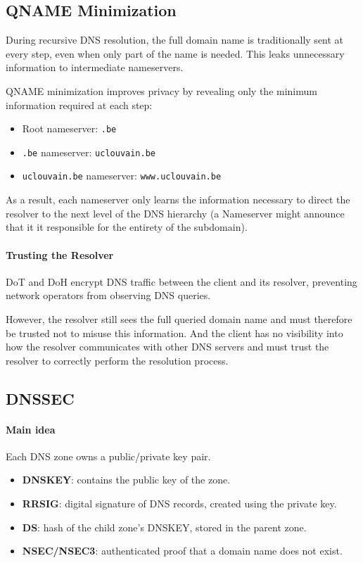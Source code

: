 \subsection{QNAME Minimization}

During recursive DNS resolution, the full domain name is traditionally sent at every step, even when only part of the name is needed. This leaks unnecessary information to intermediate nameservers.

QNAME minimization improves privacy by revealing only the minimum information required at each step:

\begin{itemize}
    \item Root nameserver: \texttt{.be}
    \item \texttt{.be} nameserver: \texttt{uclouvain.be}
    \item \texttt{uclouvain.be} nameserver: \texttt{www.uclouvain.be}
\end{itemize}

As a result, each nameserver only learns the information necessary to direct the resolver to the next level of the DNS hierarchy (a Nameserver might announce that it it responsible for the entirety of the subdomain).

\paragraph{Trusting the Resolver}

DoT and DoH encrypt DNS traffic between the client and its resolver, preventing network operators from observing DNS queries.

However, the resolver still sees the full queried domain name and must therefore be trusted not to misuse this information. And the client has no visibility into how the resolver communicates with other DNS servers and must trust the resolver to correctly perform the resolution process.


\subsection{DNSSEC}

\paragraph{Main idea}

Each DNS zone owns a public/private key pair.

\begin{itemize}
    \item \textbf{DNSKEY}: contains the public key of the zone.
    \item \textbf{RRSIG}: digital signature of DNS records, created using the private key.
    \item \textbf{DS}: hash of the child zone's DNSKEY, stored in the parent zone.
    \item \textbf{NSEC/NSEC3}: authenticated proof that a domain name does not exist.
\end{itemize}

